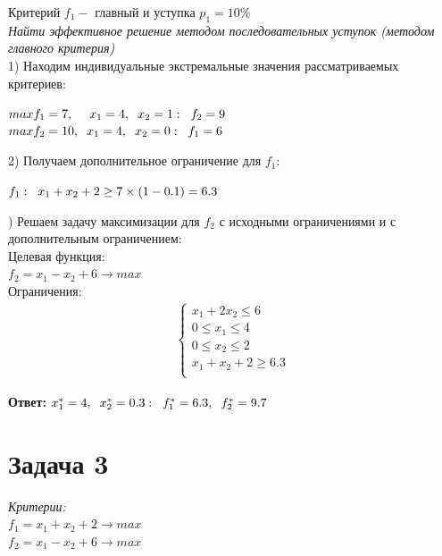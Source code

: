 \documentclass[14pt,fleqn]{extarticle}
\begin{document}
	Критерий $f_1 -$ главный и уступка $p_1 = 10\%$\\
	
	\textit{Найти эффективное решение методом последовательных уступок (методом главного критерия)}\\
	
	1) Находим индивидуальные экстремальные значения рассматриваемых критериев:
	\begin{center}
		$max f_1 = 7, \hspace{0.45cm} x_1 = 4, \hspace{0.2cm} x_2 = 1: \hspace{0.2cm} f_2 = 9$\\
		$max f_2 = 10, \hspace{0.2cm} x_1 = 4, \hspace{0.2cm} x_2 = 0: \hspace{0.2cm} f_1 = 6$
	\end{center}
	2) Получаем дополнительное ограничение для $f_1$:\\
	\begin{center}
		$f_1: \hspace{0.2cm} x_1 + x_2 + 2 \geq 7 \times (1-0.1) = 6.3$
	\end{center}
	) Решаем задачу максимизации для $f_2$ с исходными ограничениями и с дополнительным ограничением:\\
	
	Целевая функция:\\
	$f_2 = x_1 - x_2 + 6 \longrightarrow max$\\
	
	Ограничения:
		\begin{align*}
		\begin{cases}
			x_1 + 2x_2 \leq 6\\
			0 \leq x_1 \leq 4\\
			0 \leq x_2 \leq 2\\
			x_1 + x_2 + 2 \geq 6.3\\
		\end{cases}
	\end{align*}

	\textbf{Ответ:} $x_1^* = 4, \hspace{0.2cm} x_2^* = 0.3: \hspace{0.2cm} f_1^* = 6.3, \hspace{0.2cm} f_2^* = 9.7$
	
		\section*{Задача 3}
	\textit{Критерии:}\\
	$f_1 = x_1 + x_2 + 2 \longrightarrow max$\\
	$f_2 = x_1 - x_2 + 6 \longrightarrow max$\\
	
\end{document}
